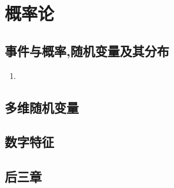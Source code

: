 \documentclass[12pt, a4paper, oneside, UTF8]{ctexbook}
\begin{document}
\else
\fi
\chapter{概率论}

\section{事件与概率,随机变量及其分布}
\begin{enumerate}
    \item 
\end{enumerate}


\section{多维随机变量}

\section{数字特征}

\section{后三章}

\ifx\allfiles\undefined
\end{document}
